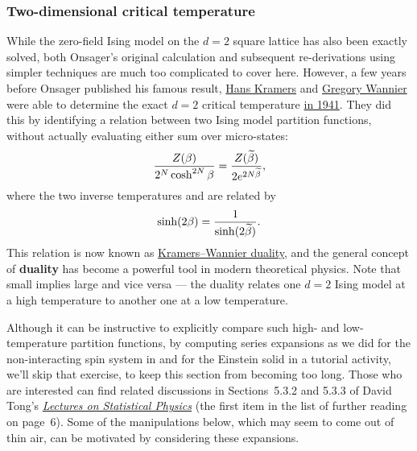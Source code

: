 \subsubsection{Two-dimensional critical temperature}
While the zero-field Ising model on the $d = 2$ square lattice has also been exactly solved, both Onsager's original calculation and subsequent re-derivations using simpler techniques are much too complicated to cover here.
However, a few years before Onsager published his famous result, \href{https://en.wikipedia.org/wiki/Hans_Kramers}{Hans Kramers} and \href{https://en.wikipedia.org/wiki/Gregory_Wannier}{Gregory Wannier} were able to determine the exact $d = 2$ critical temperature \href{https://doi.org/10.1103/PhysRev.60.252}{in 1941}.
They did this by identifying a relation between two Ising model partition functions, without actually evaluating either sum over micro-states:
\begin{equation}
  \label{eq:dual_Z}
  \frac{Z(\beta)}{2^N \cosh^{2N} \beta} = \frac{Z(\widetilde{\beta})}{2e^{2N\widetilde{\beta}}},
\end{equation}
where the two inverse temperatures \be and \betw are related by
\begin{equation}
  \label{eq:dual_beta}
  \sinh(2\beta) = \frac{1}{\sinh(2\widetilde{\beta})}.
\end{equation}
This relation is now known as \href{https://en.wikipedia.org/wiki/Kramers-Wannier_duality}{Kramers--Wannier duality}, and the general concept of \textbf{duality} has become a powerful tool in modern theoretical physics.
Note that small \be implies large \betw and vice versa --- the duality relates one $d = 2$ Ising model at a high temperature to another one at a low temperature.

Although it can be instructive to explicitly compare such high- and low-temperature partition functions, by computing series expansions as we did for the non-interacting spin system in  and for the Einstein solid in a tutorial activity, we'll skip that exercise, to keep this section from becoming too long.
Those who are interested can find related discussions in Sections~5.3.2 and 5.3.3 of David Tong's \href{https://www.damtp.cam.ac.uk/user/tong/statphys.html}{\textit{Lectures on Statistical Physics}} (the first item in the list of further reading on page~6).
Some of the manipulations below, which may seem to come out of thin air, can be motivated by considering these expansions.


